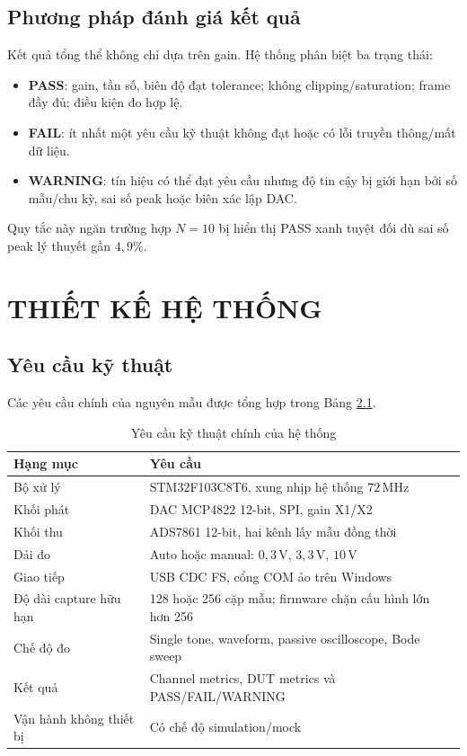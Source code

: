 \documentclass[12pt,a4paper]{report}
\newcommand{\unit}[1]{\,\mathrm{#1}}
\newcommand{\tableheadcolor}{\rowcolor{gray!18}}
\begin{document}
\section{Phương pháp đánh giá kết quả}
Kết quả tổng thể không chỉ dựa trên gain. Hệ thống phân biệt ba trạng thái:
\begin{itemize}
    \item \textbf{PASS}: gain, tần số, biên độ đạt tolerance; không clipping/saturation; frame đầy đủ; điều kiện đo hợp lệ.
    \item \textbf{FAIL}: ít nhất một yêu cầu kỹ thuật không đạt hoặc có lỗi truyền thông/mất dữ liệu.
    \item \textbf{WARNING}: tín hiệu có thể đạt yêu cầu nhưng độ tin cậy bị giới hạn bởi số mẫu/chu kỳ, sai số peak hoặc biên xác lập DAC.
\end{itemize}
Quy tắc này ngăn trường hợp $N=10$ bị hiển thị PASS xanh tuyệt đối dù sai số peak lý thuyết gần $4{,}9\%$.

\chapter{THIẾT KẾ HỆ THỐNG}

\section{Yêu cầu kỹ thuật}
Các yêu cầu chính của nguyên mẫu được tổng hợp trong Bảng \ref{tab:requirements}.
\begin{table}[H]
\centering
\caption{Yêu cầu kỹ thuật chính của hệ thống}
\label{tab:requirements}
\begin{tabularx}{\textwidth}{|p{4.2cm}|X|}
\hline
\tableheadcolor\textbf{Hạng mục} & \textbf{Yêu cầu} \\ \hline
Bộ xử lý & STM32F103C8T6, xung nhịp hệ thống $72\unit{MHz}$ \\ \hline
Khối phát & DAC MCP4822 12-bit, SPI, gain X1/X2 \\ \hline
Khối thu & ADS7861 12-bit, hai kênh lấy mẫu đồng thời \\ \hline
Dải đo & Auto hoặc manual: $0{,}3\unit{V}$, $3{,}3\unit{V}$, $10\unit{V}$ \\ \hline
Giao tiếp & USB CDC FS, cổng COM ảo trên Windows \\ \hline
Độ dài capture hữu hạn & 128 hoặc 256 cặp mẫu; firmware chặn cấu hình lớn hơn 256 \\ \hline
Chế độ đo & Single tone, waveform, passive oscilloscope, Bode sweep \\ \hline
Kết quả & Channel metrics, DUT metrics và PASS/FAIL/WARNING \\ \hline
Vận hành không thiết bị & Có chế độ simulation/mock \\ \hline
\end{tabularx}
\end{table}
\end{document}
